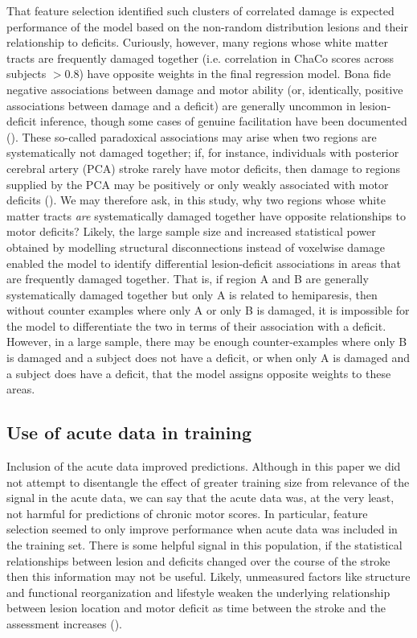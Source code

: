 \documentclass[phd,tocprelim]{cornell}
\begin{document}
That feature selection identified such clusters of correlated damage is expected performance of the model based on the non-random distribution lesions and their relationship to deficits. Curiously, however, many regions whose white matter tracts are frequently damaged together (i.e. correlation in ChaCo scores across subjects $>$0.8) have opposite weights in the final regression model. Bona fide negative associations between damage and motor ability (or, identically, positive associations between damage and a deficit) are generally uncommon in lesion-deficit inference, though some cases of genuine facilitation have been documented (\cite{Kapur1996-xq, Sperber2020-kp}). These so-called paradoxical associations may arise when two regions are systematically not damaged together; if, for instance, individuals with posterior cerebral artery (PCA) stroke rarely have motor deficits, then damage to regions supplied by the PCA may be positively or only weakly associated with motor deficits (\cite{Sperber2020-kp}). We may therefore ask, in this study, why two regions whose white matter tracts \textit{are} systematically damaged together have opposite relationships to motor deficits? Likely, the large sample size and increased statistical power obtained by modelling structural disconnections instead of voxelwise damage enabled the model to identify differential lesion-deficit associations in areas that are frequently damaged together. That is, if region A and B are generally systematically damaged together but only A is related to hemiparesis, then without counter examples where only A or only B is damaged, it is impossible for the model to differentiate the two in terms of their association with a deficit. However, in a large sample, there may be enough counter-examples where only B is damaged and a subject does not have a deficit, or when only A is damaged and a subject does have a deficit, that the model assigns opposite weights to these areas. 


\subsection{Use of acute data in training}
Inclusion of the acute data improved predictions. Although in this paper we did not attempt to disentangle the effect of greater training size from relevance of the signal in the acute data, we can say that the acute data was, at the very least, not harmful for predictions of chronic motor scores. In particular, feature selection seemed to only improve performance when acute data was included in the training set. There is some helpful signal in this population, if the statistical relationships between lesion and deficits changed over the course of the stroke then this information may not be useful. Likely, unmeasured factors like structure and functional reorganization and lifestyle weaken the underlying relationship between lesion location and motor deficit as time between the stroke and the assessment increases (\cite{Shahid2017-gx}). 
\end{document}

